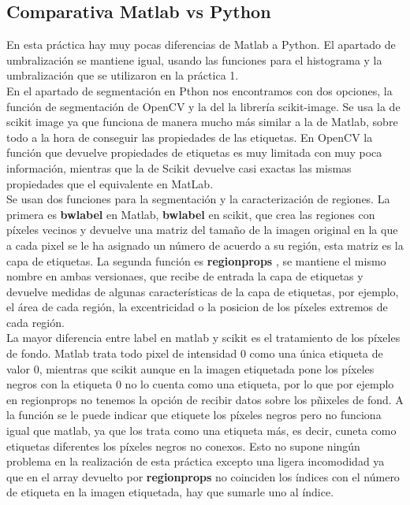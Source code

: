 \documentclass[a4paper,12pt]{report}
\begin{document}
\subsection{Comparativa Matlab vs Python}

En esta práctica hay muy pocas diferencias de Matlab a Python. El apartado de umbralización se mantiene igual, usando las funciones para el histograma y la umbralización que se utilizaron en la práctica 1.\\

En el apartado de segmentación en Pthon nos encontramos con dos opciones, la función de segmentación de OpenCV y la del la librería scikit-image. Se usa la de scikit image ya que funciona de manera mucho más similar a la de Matlab, sobre todo a la hora de conseguir las propiedades de las etiquetas. En OpenCV la función que devuelve propiedades de etiquetas es muy limitada con muy poca información, mientras que la de Scikit devuelve casi exactas las mismas propiedades que el equivalente en MatLab.\\


 Se usan dos funciones para la segmentación y la caracterización de regiones. La primera es \textbf{bwlabel} en Matlab, \textbf{bwlabel} en scikit,  que crea las regiones con píxeles vecinos y devuelve una matriz del tamaño de la imagen original en la que a cada pixel se le ha asignado un número de acuerdo a su región, esta matriz es la capa de etiquetas. La segunda función es \textbf{regionprops} , se mantiene el mismo nombre en ambas versionaes, que recibe de entrada la capa de etiquetas y devuelve medidas de algunas características de la capa de etiquetas, por ejemplo, el área de cada región, la excentricidad o la posicion de los píxeles extremos de cada región.\\

La mayor diferencia entre label en matlab y scikit es el tratamiento de los píxeles de fondo. Matlab trata todo pixel de intensidad 0 como una única etiqueta de valor 0, mientras que scikit aunque en la imagen etiquetada pone los píxeles negros con la etiqueta 0 no lo cuenta como una etiqueta, por lo que por ejemplo en regionprops no tenemos la opción de recibir datos sobre los pñixeles de fond. A la función se le puede indicar que etiquete los píxeles negros pero no funciona igual que matlab, ya que los trata como una etiqueta más, es decir, cuneta como etiquetas diferentes los píxeles negros no conexos. Esto no supone ningún problema en la realización de esta práctica excepto una ligera incomodidad ya que en el array devuelto por \textbf{regionprops} no coinciden los índices con el número de etiqueta en la imagen etiquetada, hay que sumarle uno al índice.
\end{document}
